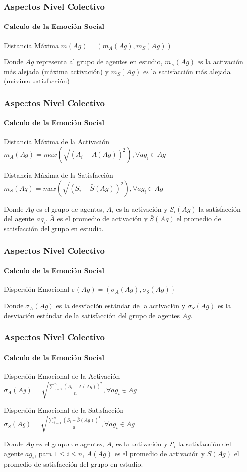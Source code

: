 \documentclass{beamer}
\begin{document}
\begin{frame}
\frametitle{Aspectos Nivel Colectivo}
\framesubtitle{Calculo de la Emoción Social}
\begin{exampleblock}{Distancia Máxima}
$ m(Ag) = (m_A(Ag), m_S(Ag))$
\end{exampleblock}

Donde $Ag$ representa al grupo de agentes en estudio, $m_A(Ag)$ es
la activación más alejada (máxima activación) y $m_S(Ag)$ es la satisfacción más
alejada (máxima satisfacción).
\end{frame}

\begin{frame}
\frametitle{Aspectos Nivel Colectivo}
\framesubtitle{Calculo de la Emoción Social}

\begin{exampleblock}{Distancia Máxima de la Activación}
$m_A(Ag) = max\left(\sqrt{(A_i - \bar A(Ag))^2}\right), \forall ag_i \in Ag$
\end{exampleblock}

\begin{exampleblock}{Distancia Máxima de la Satisfacción}
$m_S(Ag) = max\left(\sqrt{(S_i - \bar S(Ag))^2}\right), \forall ag_i \in Ag$
\end{exampleblock}

Donde $Ag$ es el grupo de agentes, $A_i$ es la activación y $S_i(Ag)$ la satisfacción del agente $ag_i$,
 $\bar A$ es el promedio de activación y $\bar S(Ag)$ el promedio de satisfacción del grupo en estudio.
\end{frame}

\begin{frame}
\frametitle{Aspectos Nivel Colectivo}
\framesubtitle{Calculo de la Emoción Social}
\begin{exampleblock}{Dispersión Emocional}
$ \sigma(Ag) = (\sigma_A(Ag), \sigma_S(Ag))$
\end{exampleblock}

Donde $\sigma_A(Ag)$ es la desviación estándar de la activación y
$\sigma_S(Ag)$ es la desviación estándar de la satisfacción del grupo
de agentes $Ag$.
\end{frame}

\begin{frame}
\frametitle{Aspectos Nivel Colectivo}
\framesubtitle{Calculo de la Emoción Social}

\begin{exampleblock}{Dispersión Emocional de la Activación}
$\sigma_A(Ag) = \sqrt{\frac{\sum_{i=1}^n(A_i - \bar A(Ag))^2}{n}},  \forall ag_i \in Ag$
\end{exampleblock}

\begin{exampleblock}{Dispersión Emocional de la Satisfacción}
$  \sigma_S(Ag) = \sqrt{\frac{\sum_{i=1}^n(S_i - \bar S(Ag))^2}{n}},  \forall ag_i \in Ag$
\end{exampleblock}

Donde $Ag$ es el grupo de agentes, $A_i$ es la activación y $S_i$ la satisfacción del agente $ag_i$,
para $1 \leq i \leq n$, $\bar A(Ag)$ es el promedio de activación y $\bar S(Ag)$
el promedio de satisfacción del grupo en estudio.
\end{frame}
\end{document}
